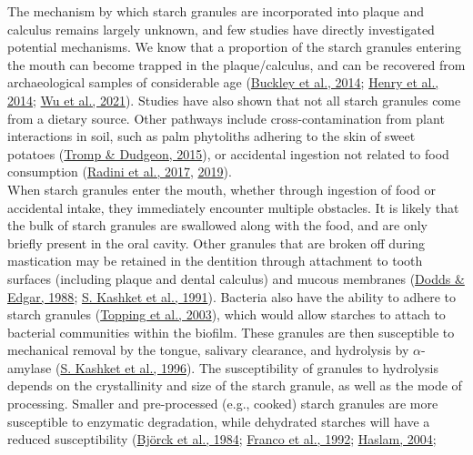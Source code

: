 \documentclass[
  b5paper,
]{book}
\begin{document}
The mechanism by which starch granules are incorporated into plaque and
calculus remains largely unknown, and few studies have directly
investigated potential mechanisms. We know that a proportion of the
starch granules entering the mouth can become trapped in the
plaque/calculus, and can be recovered from archaeological samples of
considerable age
(\protect\hyperlink{ref-buckleyDentalCalculus2014}{Buckley et al.,
2014}; \protect\hyperlink{ref-henryNeanderthalCalculus2014}{Henry et
al., 2014}; \protect\hyperlink{ref-wuDietEarliest2021}{Wu et al.,
2021}). Studies have also shown that not all starch granules come from a
dietary source. Other pathways include cross-contamination from plant
interactions in soil, such as palm phytoliths adhering to the skin of
sweet potatoes (\protect\hyperlink{ref-trompDietaryNondietary2015}{Tromp
\& Dudgeon, 2015}), or accidental ingestion not related to food
consumption (\protect\hyperlink{ref-radiniFoodPathways2017}{Radini et
al., 2017}, \protect\hyperlink{ref-radiniMedievalWomen2019}{2019}).\\
When starch granules enter the mouth, whether through ingestion of food
or accidental intake, they immediately encounter multiple obstacles. It
is likely that the bulk of starch granules are swallowed along with the
food, and are only briefly present in the oral cavity. Other granules
that are broken off during mastication may be retained in the dentition
through attachment to tooth surfaces (including plaque and dental
calculus) and mucous membranes
(\protect\hyperlink{ref-doddsCarbohydrateRetention1988}{Dodds \& Edgar,
1988}; \protect\hyperlink{ref-kashketFoodRetention1991}{S. Kashket et
al., 1991}). Bacteria also have the ability to adhere to starch granules
(\protect\hyperlink{ref-toppingResistantStarch2003}{Topping et al.,
2003}), which would allow starches to attach to bacterial communities
within the biofilm. These granules are then susceptible to mechanical
removal by the tongue, salivary clearance, and hydrolysis by
\(\alpha\)-amylase (\protect\hyperlink{ref-kashketFoodParticles1996}{S.
Kashket et al., 1996}). The susceptibility of granules to hydrolysis
depends on the crystallinity and size of the starch granule, as well as
the mode of processing. Smaller and pre-processed (e.g., cooked) starch
granules are more susceptible to enzymatic degradation, while dehydrated
starches will have a reduced susceptibility
(\protect\hyperlink{ref-bjorckStarchProcessing1984}{Björck et al.,
1984}; \protect\hyperlink{ref-francoStarchDegradation1992}{Franco et
al., 1992};
\protect\hyperlink{ref-haslamDecompositionStarch2004}{Haslam, 2004};
\end{document}
